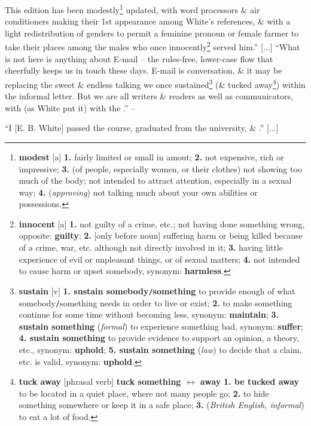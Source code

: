 \documentclass{article}
\begin{document}
This edition has been modestly\footnote{{\bf modest} [a] {\bf 1.} fairly limited or small in amout; {\bf 2.} not expensive, rich or impressive; {\bf 3.} (of people, especially women, or their clothes) not showing too much of the body; not intended to attract attention, especially in a sexual way; {\bf 4.} ({\it approving}) not talking much about your own abilities or possessions.} updated, with word processors \& air conditioners making their 1st appearance among White's references, \& with a light redistribution of genders to permit a feminine pronoun or female farmer to take their places among the males who once innocently\footnote{{\bf innocent} [a] {\bf 1.} not guilty of a crime, etc.; not having done something wrong, {\sc opposite}: {\bf guilty}; {\bf 2.} [only before noun] suffering harm or being killed because of a crime, war, etc. although not directly involved in it; {\bf 3.} having little experience of evil or unpleasant things, or of sexual matters; {\bf 4.} not intended to cause harm or upset somebody, {\sc synonym}: {\bf harmless}.} served him.'' [$\ldots$] ``What is not here is anything about E-mail -- the rules-free, lower-case flow that cheerfully keeps us in touch these days. E-mail is conversation, \& it may be replacing the sweet \& endless talking we once sustained\footnote{{\bf sustain} [v] {\bf 1. sustain somebody{\tt/}something} to provide enough of what somebody{\tt/}something needs in order to live or exist; {\bf 2.} to make something continue for some time without becoming less, {\sc synonym}: {\bf maintain}; {\bf 3. sustain something} ({\it formal}) to experience something bad, {\sc synonym}: {\bf suffer}; {\bf 4. sustain something} to provide evidence to support an opinion, a theory, etc., {\sc synonym}: {\bf uphold}; {\bf 5. sustain something} ({\it law}) to decide that a claim, etc. is valid, {\sc synonym}: {\bf uphold}.} (\& tucked away\footnote{{\bf tuck away} [phrasal verb] {\bf tuck something $\leftrightarrow$ away} {\bf 1. be tucked away} to be located in a quiet place, where not many people go; {\bf 2.} to hide something somewhere or keep it in a safe place; {\bf 3.} ({\it British English, informal}) to eat a lot of food.}) within the informal letter. But we are all writers \& readers as well as communicators, with  (as White put it) with the .'' -- \cite[{\it Foreword} by Roger Angell]{Strunk_White_element_style}

``I [E. B. White] passed the course, graduated from the university, \& .'' [$\ldots$]
\end{document}
